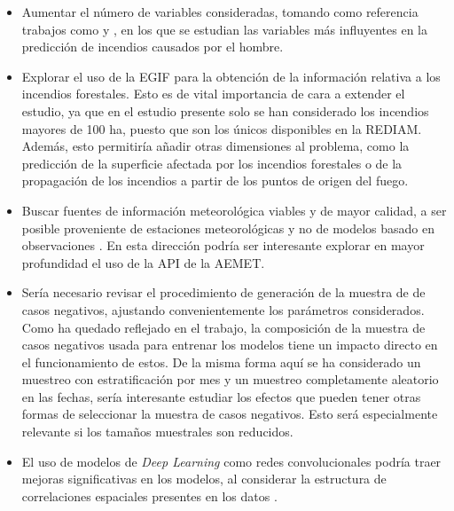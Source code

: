 \documentclass[12pt,a4paper,]{book}
\numberwithin{dummy}{section}
\theoremstyle{ocrenumbox}
\theoremstyle{blacknumex}
\theoremstyle{blacknumbox}
\theoremstyle{ocrenum}
\theoremstyle{ocrenum}
\begin{document}
\begin{itemize}
\item
  Aumentar el número de variables consideradas, tomando como referencia
  trabajos como \citet{HumanCauseWildFiresSpain} y \citet{logreg_hcwf},
  en los que se estudian las variables más influyentes en la predicción
  de incendios causados por el hombre.
\item
  Explorar el uso de la EGIF para la obtención de la información
  relativa a los incendios forestales. Esto es de vital importancia de
  cara a extender el estudio, ya que en el estudio presente solo se han
  considerado los incendios mayores de 100 ha, puesto que son los únicos
  disponibles en la REDIAM. Además, esto permitiría añadir otras
  dimensiones al problema, como la predicción de la superficie afectada
  por los incendios forestales o de la propagación de los incendios a
  partir de los puntos de origen del fuego.
\item
  Buscar fuentes de información meteorológica viables y de mayor
  calidad, a ser posible proveniente de estaciones meteorológicas y no
  de modelos basado en observaciones . En esta dirección podría ser
  interesante explorar en mayor profundidad el uso de la API de la
  AEMET.
\item
  Sería necesario revisar el procedimiento de generación de la muestra
  de de casos negativos, ajustando convenientemente los parámetros
  considerados. Como ha quedado reflejado en el trabajo, la composición
  de la muestra de casos negativos usada para entrenar los modelos tiene
  un impacto directo en el funcionamiento de estos. De la misma forma
  aquí se ha considerado un muestreo con estratificación por mes y un
  muestreo completamente aleatorio en las fechas, sería interesante
  estudiar los efectos que pueden tener otras formas de seleccionar la
  muestra de casos negativos. Esto será especialmente relevante si los
  tamaños muestrales son reducidos.
\item
  El uso de modelos de \emph{Deep Learning} como redes convolucionales
  podría traer mejoras significativas en los modelos, al considerar la
  estructura de correlaciones espaciales presentes en los datos
  \citep{SpainOnFire}.
\end{itemize}




%
\end{document}
